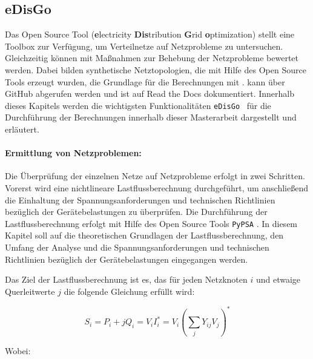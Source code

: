 \subsection{eDisGo}\label{chap:edisgo_theo}

Das Open Source Tool \edisgo (\textbf{e}lectricity \textbf{Dis}tribution \textbf{G}rid \textbf{o}ptimization) stellt eine Toolbox zur Verfügung, um Verteilnetze auf Netzprobleme zu untersuchen.
Gleichzeitig können mit \edisgo Maßnahmen zur Behebung der Netzprobleme bewertet werden.
Dabei bilden synthetische Netztopologien, die mit Hilfe des Open Source Tools \dingo erzeugt wurden, die Grundlage für die Berechnungen mit \edisgodot.
\edisgo kann über GitHub \cite{edisgoGit2019} abgerufen werden und ist auf Read the Docs \cite{edisgoDocs2017} dokumentiert.
Innerhalb dieses Kapitels werden die wichtigsten Funktionalitäten \texttt{eDisGo}~ für die Durchführung der Berechnungen innerhalb dieser Masterarbeit dargestellt und erläutert.


\paragraph{Ermittlung von Netzproblemen:}\label{chap:grid_issues}

Die Überprüfung der einzelnen Netze auf Netzprobleme erfolgt in zwei Schritten.
Vorerst wird eine nichtlineare Lastflussberechnung durchgeführt, um anschließend die Einhaltung der Spannungsanforderungen und technischen Richtlinien bezüglich der Gerätebelastungen zu überprüfen.
Die Durchführung der Lastflussberechnung erfolgt mit Hilfe des Open Source Tools \texttt{PyPSA} \cite{Brown2020}.
In diesem Kapitel soll auf die theoretischen Grundlagen der Lastflussberechnung, den Umfang der Analyse und die Spannungsanforderungen und technischen Richtlinien bezüglich der Gerätebelastungen eingegangen werden.\medskip

Das Ziel der Lastflussberechnung ist es, das für jeden Netzknoten $i$ und etwaige Querleitwerte $j$ die folgende Gleichung erfüllt wird:

\begin{equation}
	S_i = P_i + j Q_i = V_i I_i^* = V_i \left(\sum_j Y_{ij} V_j \right)^*
	\label{eq:pf}
\end{equation}

\noindent Wobei:


